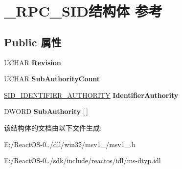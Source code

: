 \hypertarget{struct___r_p_c___s_i_d}{}\section{\+\_\+\+R\+P\+C\+\_\+\+S\+I\+D结构体 参考}
\label{struct___r_p_c___s_i_d}
\subsection*{Public 属性}
\begin{DoxyCompactItemize}
\item 
\mbox{\label{struct___r_p_c___s_i_d_a1920a69655c4bd55c1a8b7cd7ccbe674}} 
U\+C\+H\+AR {\bfseries Revision}
\item 
\mbox{\label{struct___r_p_c___s_i_d_a9faaa850497bcfe970ab087c3efd181c}} 
U\+C\+H\+AR {\bfseries Sub\+Authority\+Count}
\item 
\mbox{\label{struct___r_p_c___s_i_d_a287cf5fbbbcf4cb6fc4cd5b92bc5534e}} 
\hyperlink{struct___s_i_d___i_d_e_n_t_i_f_i_e_r___a_u_t_h_o_r_i_t_y}{S\+I\+D\+\_\+\+I\+D\+E\+N\+T\+I\+F\+I\+E\+R\+\_\+\+A\+U\+T\+H\+O\+R\+I\+TY} {\bfseries Identifier\+Authority}
\item 
\mbox{\label{struct___r_p_c___s_i_d_ae872a000d98c8bb739886c4d479f43b4}} 
D\+W\+O\+RD {\bfseries Sub\+Authority} \mbox{[}$\,$\mbox{]}
\end{DoxyCompactItemize}


该结构体的文档由以下文件生成\+:\begin{DoxyCompactItemize}
\item 
E\+:/\+React\+O\+S-\/0../dll/win32/msv1\+\_/msv1\+\_.\+h\item 
E\+:/\+React\+O\+S-\/0../sdk/include/reactos/idl/ms-\/dtyp.\+idl\end{DoxyCompactItemize}
